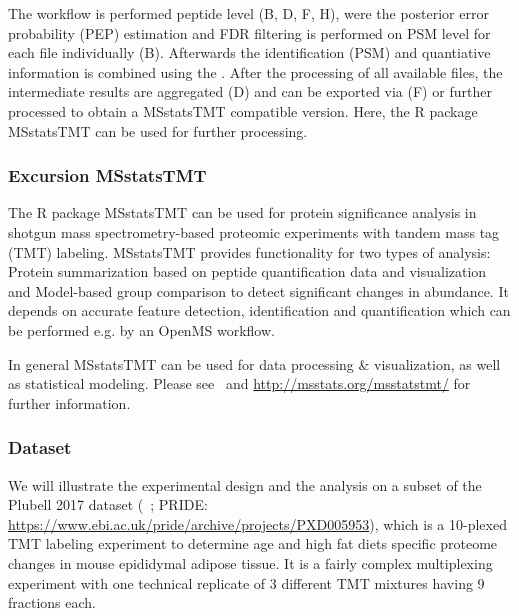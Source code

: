 The workflow is performed peptide level (B, D, F, H), were the posterior error probability (PEP) estimation and FDR filtering is performed on PSM level for each file individually (B). Afterwards the identification (PSM) and quantiative information is combined using the . After the processing of all available files, the intermediate results are aggregated (D) and can be exported via  (F) or further processed to obtain a MSstatsTMT
compatible version. Here, the R package MSstatsTMT can be used for further processing. \\

\subsubsection{Excursion MSstatsTMT}
The R package MSstatsTMT can be used for protein significance analysis in shotgun mass spectrometry-based proteomic experiments with tandem mass tag (TMT) labeling. MSstatsTMT provides functionality for two types of analysis: Protein summarization based on peptide quantification data and visualization and Model-based group comparison to detect significant changes in abundance. It depends on accurate feature detection, identification and quantification which can be performed e.g. by an OpenMS workflow. 

\noindent In general MSstatsTMT can be used for data processing \& visualization, as well as statistical modeling. Please see~\cite{Huang2020} and \url{http://msstats.org/msstatstmt/} for further information.

\subsubsection{Dataset}
We will illustrate the experimental design and the analysis on a subset of the Plubell 2017 dataset (~\cite{Plubell2017}; PRIDE: \url{https://www.ebi.ac.uk/pride/archive/projects/PXD005953}), which is a 10-plexed TMT labeling experiment to determine age and high fat diets specific proteome changes in mouse epididymal adipose tissue. It is a fairly complex multiplexing experiment with one technical replicate of 3 different TMT mixtures having 9 fractions each. 

